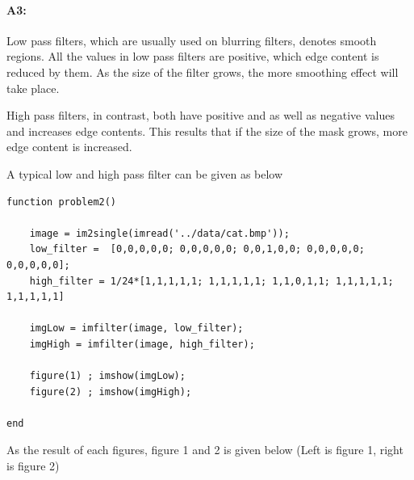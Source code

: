 	\paragraph{A3:} Low pass filters, which are usually used on blurring filters, denotes smooth regions. All the values in low pass filters are positive, which edge content is reduced by them. As the size of the filter grows, the more smoothing effect will take place. 
	
	High pass filters, in contrast, both have positive and as well as negative values and increases edge contents. This results that if the size of the mask grows, more edge content is increased.
	
	A typical low and high pass filter can be given as below
	
\begin{lstlisting}[style=Matlab-editor]
function problem2()

    image = im2single(imread('../data/cat.bmp'));
    low_filter =  [0,0,0,0,0; 0,0,0,0,0; 0,0,1,0,0; 0,0,0,0,0; 0,0,0,0,0];
    high_filter = 1/24*[1,1,1,1,1; 1,1,1,1,1; 1,1,0,1,1; 1,1,1,1,1; 1,1,1,1,1]
    
    imgLow = imfilter(image, low_filter);
    imgHigh = imfilter(image, high_filter);
    
    figure(1) ; imshow(imgLow);
    figure(2) ; imshow(imgHigh);

end
\end{lstlisting}	
	
	As the result of each figures, figure 1 and 2 is given below (Left is figure 1, right is figure 2)
	

